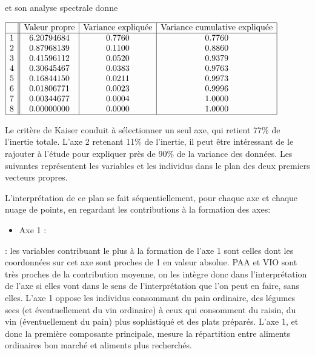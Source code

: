 \documentclass[letterpaper,10pt,english]{jupyterBook}
\begin{document}
\sphinxAtStartPar
et son analyse spectrale donne

\sphinxAtStartPar
\(\begin{array}{|c||c|c|c|}
\hline
                      &    \textrm{Valeur propre}  &      \textrm{Variance expliquée}  &  \textrm{Variance cumulative expliquée}\\
\hline
                     1  &  6.20794684      &      0.7760  &      0.7760\\
                     2   & 0.87968139      &      0.1100    &    0.8860\\
                     3    &0.41596112    &        0.0520      &  0.9379\\
                     4    &0.30645467    &        0.0383      &  0.9763\\
                     5    &0.16844150    &        0.0211      &  0.9973\\
                     6    &0.01806771    &       0.0023       & 0.9996\\
                     7    &0.00344677    &       0.0004       & 1.0000\\
                     8    &0.00000000        &              0.0000      &  1.0000\\
\hline
\end{array}\)

\sphinxAtStartPar
Le critère de Kaiser  conduit à sélectionner un seul axe, qui retient 77\% de l’inertie totale. L’axe 2 retenant 11\% de l’inertie, il peut être  intéressant de le rajouter à l’étude pour expliquer près de 90\% de la variance des données. Les suivantes représentent les variables et les individus dans le plan des deux premiers vecteurs propres.

\sphinxAtStartPar
{}

\sphinxAtStartPar
L’interprétation de ce plan se fait séquentiellement, pour chaque axe et chaque nuage de points, en regardant les contributions à la formation des axes:
\begin{itemize}
\item {} 
\sphinxAtStartPar
Axe 1 :

\end{itemize}

\sphinxhyphen{}  :  les variables contribuant le plus à la formation de l’axe 1 sont celles dont les coordonnées sur cet axe sont proches de 1 en valeur absolue.
PAA et VIO sont très proches de la contribution moyenne, on les intègre donc dans l’interprétation de l’axe si elles vont dans le sens de l’interprétation que l’on peut en faire, sans elles. L’axe 1 oppose les individus consommant du pain ordinaire, des légumes secs (et éventuellement du vin ordinaire) à ceux qui consomment du raisin, du vin (éventuellement du pain) plus sophistiqué et des plats préparés. L’axe 1, et donc la première composante principale, mesure la répartition entre aliments ordinaires bon marché et aliments plus recherchés.
\end{document}
